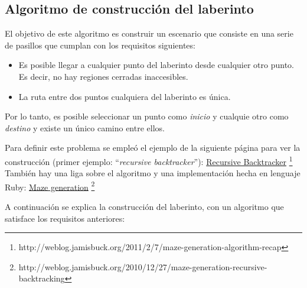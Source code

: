 \subsection{Algoritmo de construcci\'on del laberinto}

El objetivo de este algoritmo es construir un escenario que consiste en una serie de pasillos que cumplan con los requisitos siguientes:
\begin{itemize}
 \item Es posible llegar a cualquier punto del laberinto desde cualquier otro punto.  Es decir, no hay regiones cerradas inaccesibles.
 \item La ruta entre dos puntos cualquiera del laberinto es única.
\end{itemize}
Por lo tanto, es posible seleccionar un punto como \textit{inicio} y cualquie otro como \textit{destino} y existe un único camino entre ellos.

Para definir este problema se empleó el ejemplo de la siguiente página para ver la construcción (primer ejemplo: ``\textit{recursive backtracker}''):
\href{http://weblog.jamisbuck.org/2011/2/7/maze-generation-algorithm-recap}{Recursive Backtracker}
\footnote{http://weblog.jamisbuck.org/2011/2/7/maze-generation-algorithm-recap}
También hay una liga sobre el algoritmo y una implementación hecha en lenguaje Ruby:
\href{http://weblog.jamisbuck.org/2010/12/27/maze-generation-recursive-backtracking}{Maze generation}
\footnote{http://weblog.jamisbuck.org/2010/12/27/maze-generation-recursive-backtracking}

\noindent A continuación se explica la construcción del laberinto, con un algoritmo que satisface los requisitos anteriores:

